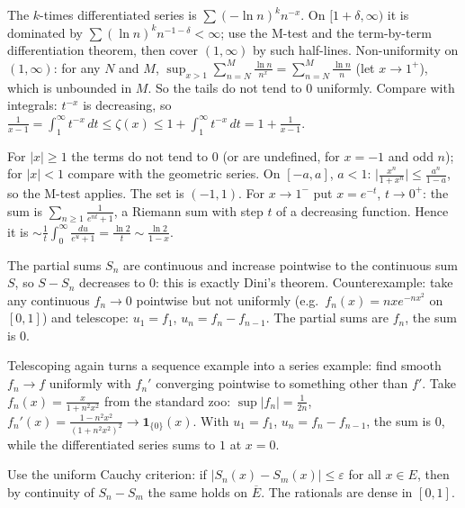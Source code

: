 \documentclass[11pt,a4paper]{article}
\begin{document}
The \(k\)-times differentiated series is \(\sum(-\ln n)^kn^{-x}\). On \([1+\delta,\infty)\) it is dominated by \(\sum(\ln n)^kn^{-1-\delta}\lt\infty\); use the M-test and the term-by-term differentiation theorem, then cover \((1,\infty)\) by such half-lines.
Non-uniformity on \((1,\infty)\): for any \(N\) and \(M\), \(\sup_{x\gt1}\sum_{n=N}^M\frac{\ln n}{n^x}=\sum_{n=N}^M\frac{\ln n}n\) (let \(x\to1^+\)), which is unbounded in \(M\). So the tails do not tend to \(0\) uniformly.
Compare with integrals: \(t^{-x}\) is decreasing, so \(\frac1{x-1}=\int_1^\infty t^{-x}\,dt\le\zeta(x)\le1+\int_1^\infty t^{-x}\,dt=1+\frac1{x-1}\).

For \(\lvert x\rvert\ge1\) the terms do not tend to \(0\) (or are undefined, for \(x=-1\) and odd \(n\)); for \(\lvert x\rvert\lt1\) compare with the geometric series. On \([-a,a]\), \(a\lt1\): \(\bigl\lvert\frac{x^n}{1+x^n}\bigr\rvert\le\frac{a^n}{1-a}\), so the M-test applies. The set is \((-1,1)\).
For \(x\to1^-\) put \(x=e^{-t}\), \(t\to0^+\): the sum is \(\sum_{n\ge1}\frac1{e^{nt}+1}\), a Riemann sum with step \(t\) of a decreasing function. Hence it is \(\sim\frac1t\int_0^\infty\frac{du}{e^u+1}=\frac{\ln2}t\sim\frac{\ln2}{1-x}\).

The partial sums \(S_n\) are continuous and increase pointwise to the continuous sum \(S\), so \(S-S_n\) decreases to \(0\): this is exactly Dini's theorem.
Counterexample: take any continuous \(f_n\to0\) pointwise but not uniformly (e.g.~\(f_n(x)=nxe^{-nx^2}\) on \([0,1]\)) and telescope: \(u_1=f_1\), \(u_n=f_n-f_{n-1}\). The partial sums are \(f_n\), the sum is \(0\).

Telescoping again turns a sequence example into a series example: find smooth \(f_n\to f\) uniformly with \(f_n'\) converging pointwise to something other than \(f'\).
Take \(f_n(x)=\frac{x}{1+n^2x^2}\) from the standard zoo: \(\sup\lvert f_n\rvert=\frac1{2n}\), \(f_n'(x)=\frac{1-n^2x^2}{(1+n^2x^2)^2}\to\mathbf 1_{\{0\}}(x)\). With \(u_1=f_1\), \(u_n=f_n-f_{n-1}\), the sum is \(0\), while the differentiated series sums to \(1\) at \(x=0\).

Use the uniform Cauchy criterion: if \(\lvert S_n(x)-S_m(x)\rvert\le\varepsilon\) for all \(x\in E\), then by continuity of \(S_n-S_m\) the same holds on \(\overline E\). The rationals are dense in \([0,1]\).
\end{document}
